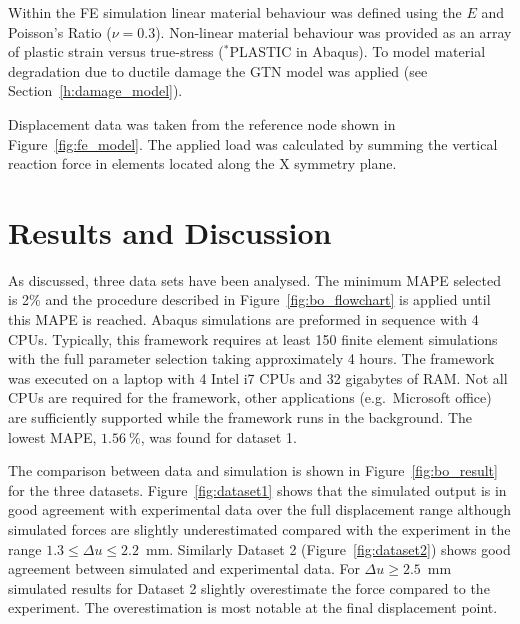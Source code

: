\documentclass[preprint, review, 12pt]{elsarticle}
\begin{document}
{	Within the FE simulation linear material behaviour was defined using the $E$ and Poisson's Ratio ($\nu=0.3$).
	Non-linear material behaviour was provided as an array of plastic strain versus true-stress ($^*$PLASTIC in Abaqus).
	To model material degradation due to ductile damage the GTN model was applied (see Section~\ref{h:damage_model}).

	Displacement data was taken from the reference node shown in Figure~\ref{fig:fe_model}.
	The applied load was calculated by summing the vertical reaction force in elements located along the X symmetry plane.

	\section{Results and Discussion}
	\label{h:results}
 	As discussed, three data sets have been analysed.
	The minimum MAPE selected is 2\% and the procedure described in Figure~\ref{fig:bo_flowchart} is applied until this MAPE is reached.
	Abaqus simulations are preformed in sequence with 4 CPUs.
	Typically, this framework requires at least 150 finite element simulations with the full parameter selection taking approximately 4 hours.
	The framework was executed on a laptop with 4 Intel i7 CPUs and 32 gigabytes of RAM.
	Not all CPUs are required for the framework, other applications (e.g.\ Microsoft office) are sufficiently supported while the framework runs in the background.
	The lowest MAPE, $1.56~$\%, was found for dataset 1.

	The comparison between data and simulation is shown in Figure~\ref{fig:bo_result} for the three datasets.
 	Figure~\ref{fig:dataset1} shows that the simulated output is in good agreement with experimental data over the full displacement range although simulated forces are slightly underestimated compared with the experiment in the range $1.3 \leq \Delta u \leq 2.2$~mm.
	Similarly Dataset 2 (Figure~\ref{fig:dataset2}) shows good agreement between simulated and experimental data.
	For $\Delta u \geq 2.5$~mm simulated results for Dataset 2 slightly overestimate the force compared to the experiment.
	The overestimation is most notable at the final displacement point.

}
\end{document}
